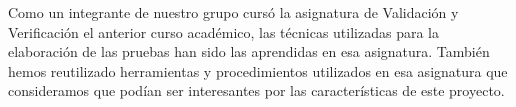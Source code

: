 Como un integrante de nuestro grupo cursó la asignatura de Validación y Verificación el anterior curso académico, las técnicas utilizadas para la elaboración de las pruebas han sido las aprendidas en esa asignatura. También hemos reutilizado herramientas y procedimientos utilizados en esa asignatura que consideramos que podían ser interesantes por las características de este proyecto.